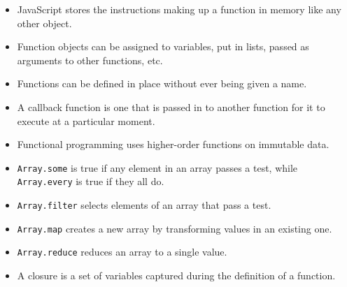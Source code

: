 \begin{itemize}
\item
  JavaScript stores the instructions making up a function in memory like any other object.
\item
  Function objects can be assigned to variables, put in lists, passed as arguments to other functions, etc.
\item
  Functions can be defined in place without ever being given a name.
\item
  A callback function is one that is passed in to another function for it to execute at a particular moment.
\item
  Functional programming uses higher-order functions on immutable data.
\item
  \texttt{Array.some} is true if any element in an array passes a test, while \texttt{Array.every} is true if they all do.
\item
  \texttt{Array.filter} selects elements of an array that pass a test.
\item
  \texttt{Array.map} creates a new array by transforming values in an existing one.
\item
  \texttt{Array.reduce} reduces an array to a single value.
\item
  A closure is a set of variables captured during the definition of a function.
\end{itemize}
